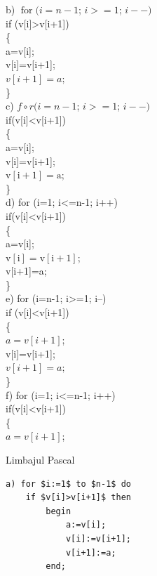 \documentclass[10pt]{article}
\begin{document}
b) $\operatorname{for}(i=n-1$; $i>=1$; $i--)$\\[0pt]
if (v[i]>v[i+1])\\
\{\\[0pt]
a=v[i];\\[0pt]
v[i]=v[i+1];\\
$v[i+1]=a ;$\\
\}\\
c) $f \circ r(i=n-1$; $i>=1$; $i--)$\\[0pt]
if(v[i]<v[i+1])\\
\{\\[0pt]
a=v[i];\\[0pt]
v[i]=v[i+1];\\
$\mathrm{v}[\mathrm{i}+1]=\mathrm{a}$;\\
\}\\
d) for (i=1; i<=n-1; i++)\\[0pt]
if(v[i]<v[i+1])\\
\{\\[0pt]
a=v[i];\\
$\mathrm{v}[\mathrm{i}]=\mathrm{v}[\mathrm{i}+1]$;\\[0pt]
v[i+1]=a;\\
\}\\
e) for (i=n-1; i>=1; i--)\\[0pt]
if (v[i]<v[i+1])\\
\{\\
$a=v[i+1]$;\\[0pt]
v[i]=v[i+1];\\
$v[i+1]=a ;$\\
\}\\
f) for (i=1; i<=n-1; i++)\\[0pt]
if(v[i]<v[i+1])\\
\{\\
$a=v[i+1]$;

Limbajul Pascal

\begin{verbatim}
a) for $i:=1$ to $n-1$ do
    if $v[i]>v[i+1]$ then
        begin
            a:=v[i];
            v[i]:=v[i+1];
            v[i+1]:=a;
        end;
\end{verbatim}
\end{document}
